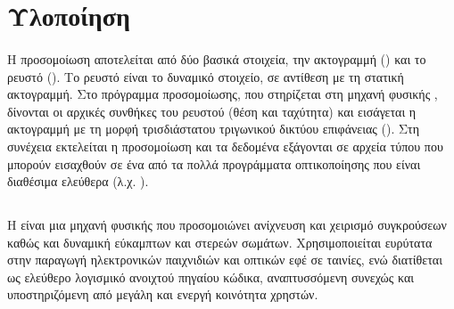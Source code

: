 \section{Υλοποίηση}

\paragraph{} Η προσομοίωση αποτελείται από δύο βασικά στοιχεία, την ακτογραμμή
() και το ρευστό (). Το ρευστό είναι το δυναμικό στοιχείο, σε
αντίθεση με τη στατική ακτογραμμή. Στο πρόγραμμα προσομοίωσης, που στηρίζεται στη μηχανή
φυσικής , δίνονται οι αρχικές συνθήκες του ρευστού (θέση και ταχύτητα) και
εισάγεται η ακτογραμμή με τη μορφή τρισδιάστατου τριγωνικού δικτύου επιφάνειας
(). Στη συνέχεια εκτελείται η προσομοίωση και τα δεδομένα
εξάγονται σε αρχεία τύπου  που μπορούν εισαχθούν σε ένα από τα πολλά προγράμματα
οπτικοποίησης που είναι διαθέσιμα ελεύθερα (λ.χ. ).

\subsection{\texorpdfstring{}{}}
\label{ssec:bullet}
\paragraph{} Η  είναι μια μηχανή φυσικής που προσομοιώνει ανίχνευση και
χειρισμό συγκρούσεων καθώς και δυναμική εύκαμπτων και στερεών σωμάτων. Χρησιμοποιείται
ευρύτατα στην παραγωγή ηλεκτρονικών παιχνιδιών και οπτικών εφέ σε ταινίες, ενώ διατίθεται
ως ελεύθερο λογισμικό ανοιχτού πηγαίου κώδικα, αναπτυσσόμενη συνεχώς και υποστηριζόμενη
από μεγάλη και ενεργή κοινότητα χρηστών.

